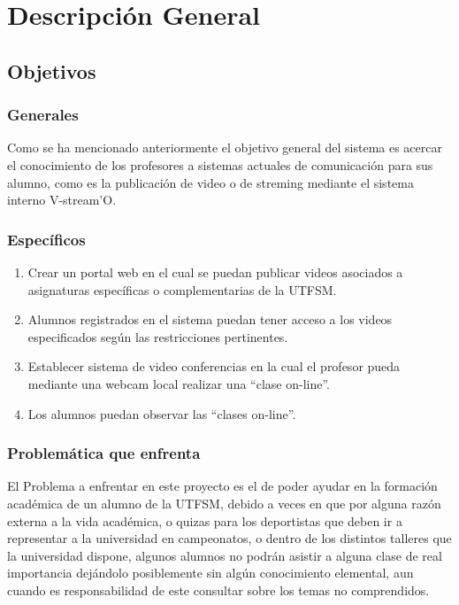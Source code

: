 \documentclass[12pt]{article}
\begin{document}
\newpage
\section{Descripción General}

\subsection{Objetivos}
\subsubsection{Generales}
Como se ha mencionado anteriormente el objetivo general del sistema es acercar el conocimiento de los 
profesores a sistemas actuales de comunicación para sus alumno, como es la publicación de video o de streming
mediante el sistema interno V-stream'O.
\subsubsection{Específicos}
\begin{enumerate}
\item Crear un portal web en el cual se puedan publicar videos asociados a asignaturas específicas o 
complementarias de la UTFSM.
\item Alumnos registrados en el sistema puedan tener acceso a los videos especificados según las
restricciones pertinentes.
\item Establecer sistema de video conferencias en la cual el profesor pueda mediante una webcam local
realizar una ``clase on-line''.
\item Los alumnos puedan observar las ``clases on-line''.%
\end{enumerate}

\subsubsection{Problemática que enfrenta}
El Problema a enfrentar en este proyecto es el de poder ayudar en la formación académica de un alumno de la 
UTFSM, debido a veces en que por alguna razón externa a la vida académica, o quizas para los
deportistas que deben ir a representar a la universidad en campeonatos, o dentro de los distintos talleres 
que la universidad dispone, algunos alumnos no podrán
asistir a alguna clase de real importancia dejándolo posiblemente sin algún conocimiento elemental, aun
cuando es responsabilidad de este consultar sobre los temas no comprendidos.
\end{document}
